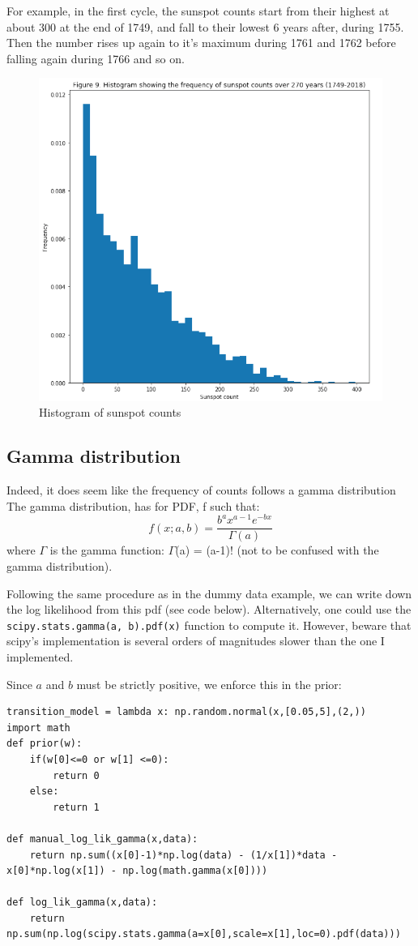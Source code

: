 For example, in the first cycle, the sunspot counts start from their highest at about 300 at the end of 1749, and fall to their lowest 6 years after, during 1755. Then the number rises up again to it's maximum during 1761 and 1762 before falling again during 1766 and so on.

\begin{figure}[h]
    \centering
\includegraphics[width=.6\textwidth]{pic/p05c08-snip10}
    \caption{Histogram of sunspot counts}
    \label{fig:p05c08-snip10}
\end{figure}

\FloatBarrier
\subsection{Gamma distribution}
Indeed, it does seem like the frequency of counts follows a gamma distribution
The gamma distribution, has for PDF, f such that:
\begin{equation}f(x ; a, b)=\frac{b^{a} x^{a-1} e^{-b x}}{\Gamma(a)}\end{equation}
where  $\Gamma$ is the gamma function:  $\Gamma$(a) = (a-1)! (not to be confused with the gamma distribution).

Following the same procedure as in the dummy data example, we can write down the log likelihood from this pdf (see code below). Alternatively, one could use the \lstinline{scipy.stats.gamma(a, b).pdf(x)} function to compute it. However, beware that scipy's implementation is several orders of magnitudes slower than the one I implemented.

Since $a$ and $b$ must be strictly positive, we enforce this in the prior:

\begin{lstlisting}
transition_model = lambda x: np.random.normal(x,[0.05,5],(2,))
import math
def prior(w):
    if(w[0]<=0 or w[1] <=0):
        return 0
    else:
        return 1
    
def manual_log_lik_gamma(x,data):
    return np.sum((x[0]-1)*np.log(data) - (1/x[1])*data - x[0]*np.log(x[1]) - np.log(math.gamma(x[0])))
    
def log_lik_gamma(x,data):
    return np.sum(np.log(scipy.stats.gamma(a=x[0],scale=x[1],loc=0).pdf(data)))    
\end{lstlisting}

